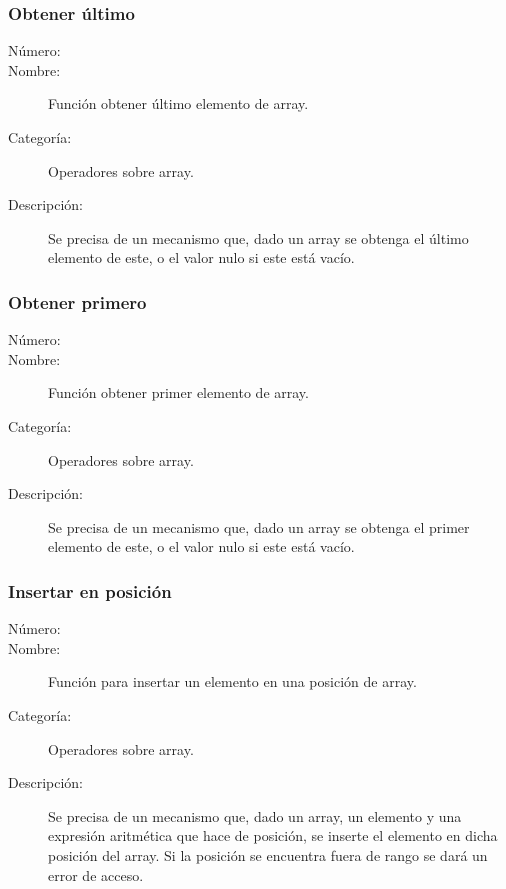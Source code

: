 \subsubsection{Obtener último}
\begin{framed}
	\begin{description}
		\item [Número:] \cn
		\item [Nombre:] Función obtener último elemento de array.
		\item [Categoría:] Operadores sobre array.
		\item [Descripción:] Se precisa de un mecanismo que, dado un array se obtenga el 
último elemento de este, o el valor nulo si este está vacío.
	\end {description}
\end{framed}

\subsubsection{Obtener primero}
\begin{framed}
	\begin{description}
		\item [Número:] \cn
		\item [Nombre:] Función obtener primer elemento de array.
		\item [Categoría:] Operadores sobre array.
		\item [Descripción:] Se precisa de un mecanismo que, dado un array se obtenga el 
primer elemento de este, o el valor nulo si este está vacío.
	\end {description}
\end{framed}

\subsubsection{Insertar en posición}
\begin{framed}
	\begin{description}
		\item [Número:] \cn
		\item [Nombre:] Función para insertar un elemento en una posición de  array.
		\item [Categoría:] Operadores sobre array.
		\item [Descripción:] Se precisa de un mecanismo que, dado un array, un elemento
y una expresión aritmética que hace de posición, se inserte el elemento en dicha posición del array.
Si la posición se encuentra fuera de rango se dará un error de acceso.
	\end {description}
\end{framed}

